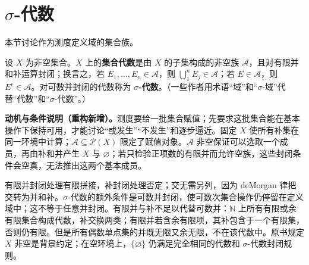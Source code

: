 \documentclass[../../main.tex]{subfiles}%
\begin{document}
\section{\texorpdfstring{$\sigma$}{σ}-代数}\label{section:ch01-sigma-algebras}

本节讨论作为测度定义域的集合族。

\begin{definition}\label{definition:ch01-algebra-definition}
设 $X$ 为非空集合。$X$ 上的\textbf{集合代数}是由 $X$ 的子集构成的非空族 $\mathscr{A}$，且对有限并和补运算封闭；换言之，若 $E_1,\ldots,E_n\in\mathscr{A}$，则 $\bigcup_1^nE_j\in\mathscr{A}$；若 $E\in\mathscr{A}$，则 $E^{\mathrm{c}}\in\mathscr{A}$。对可数并封闭的代数称为 \textbf{$\sigma$-代数}。（一些作者用术语“域”和“$\sigma$-域”代替“代数”和“$\sigma$-代数”。）
\end{definition}
\begin{remark}
\textbf{动机与条件说明（重构新增）。}测度要给一批集合赋值；先要求这批集合能在基本操作下保持可用，才能讨论“或发生”“不发生”和逐步逼近。固定 $X$ 使所有补集在同一环境中计算；$\mathscr{A}\subseteq\mathscr{P}(X)$ 限定了赋值对象。$\mathscr{A}$ 非空保证可以选取一个成员，再由补和并产生 $X$ 与 $\varnothing$；若只检验正项数的有限并而允许空族，这些封闭条件会空真，无法推出这两个基本成员。

有限并封闭处理有限拼接，补封闭处理否定；交无需另列，因为 deMorgan 律把交转为并和补。$\sigma$-代数的额外条件是可数并封闭，使可数次集合操作仍停留在定义域中；这不等于任意并封闭。有限并与补不足以代替可数并：$\mathbb{N}$ 上所有有限或余有限集合构成代数，补交换两类；有限并若含余有限项，其补包含于一个有限集，否则仍有限。但是所有偶数单点集的并既无限又余无限，不在该代数中。原书规定 $X$ 非空是背景约定；在空环境上，$\{\varnothing\}$ 仍满足完全相同的代数和 $\sigma$-代数封闭规则。
\end{remark}



\end{document}
